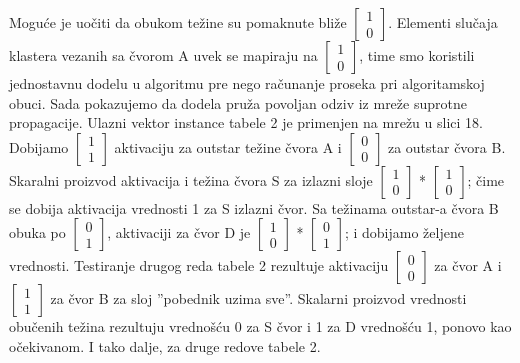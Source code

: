 \documentclass[fontsize=11bp, paper=a4]{scrarticle}
\begin{document}
Moguće je uočiti da obukom težine su pomaknute bliže $\begin{bmatrix} 1 \\ 0 \end{bmatrix}$. Elementi slučaja klastera vezanih sa čvorom A uvek se mapiraju na $\begin{bmatrix} 1 \\ 0 \end{bmatrix}$, time smo koristili jednostavnu dodelu u algoritmu pre nego računanje proseka pri algoritamskoj obuci. Sada pokazujemo da dodela pruža povoljan odziv iz mreže suprotne propagacije. Ulazni vektor instance tabele 2 je primenjen na mrežu u slici 18. Dobijamo $\begin{bmatrix} 1 \\ 1 \end{bmatrix}$ aktivaciju za outstar težine čvora A i $\begin{bmatrix} 0 \\ 0 \end{bmatrix}$ za outstar čvora B. Skaralni proizvod aktivacija i težina čvora S za izlazni sloje $\begin{bmatrix} 1 \\ 0 \end{bmatrix}$ * $\begin{bmatrix} 1 \\ 0 \end{bmatrix}$; čime se dobija aktivacija vrednosti 1 za S izlazni čvor. Sa težinama outstar-a čvora B obuka po $\begin{bmatrix} 0 \\ 1 \end{bmatrix}$, aktivaciji za čvor D je $\begin{bmatrix} 1 \\ 0 \end{bmatrix}$ * $\begin{bmatrix} 0 \\ 1 \end{bmatrix}$; i dobijamo željene vrednosti. Testiranje drugog reda tabele 2 rezultuje aktivaciju $\begin{bmatrix} 0 \\ 0 \end{bmatrix}$ za čvor A i $\begin{bmatrix} 1 \\ 1 \end{bmatrix}$ za čvor B za sloj ''pobednik uzima sve''. Skalarni proizvod vrednosti obučenih težina rezultuju vrednošću 0 za S čvor i 1 za D vrednošću 1, ponovo kao očekivanom. I tako dalje, za druge redove tabele 2.
\end{document}
